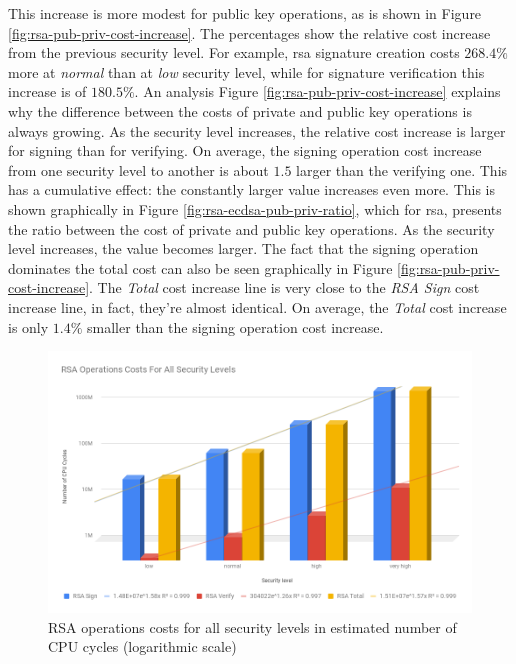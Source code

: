 This increase is more modest for public key operations, as is shown in Figure \ref{fig:rsa-pub-priv-cost-increase}.
The percentages show the relative cost increase from the previous security level. For example, \gls{rsa} signature creation costs
$268.4\%$ more at \textit{normal} than at \textit{low} security level, while for signature verification this increase is of $180.5\%$. 
An analysis Figure \ref{fig:rsa-pub-priv-cost-increase}
explains why the difference between the costs of private and public key operations is always growing. As the security level increases, the relative cost
increase is larger for signing than for verifying. On average, the signing operation cost increase from one security level to another
is about $1.5$ larger than the verifying one. This has a cumulative effect: the constantly larger value increases even more.
This is shown graphically in Figure \ref{fig:rsa-ecdsa-pub-priv-ratio}, which for \gls{rsa}, presents the ratio between the cost of private and
public key operations. As the security level increases, the value becomes larger. The fact that the signing operation dominates the total cost
can also be seen graphically in Figure \ref{fig:rsa-pub-priv-cost-increase}. The \textit{Total} cost increase line is very close to the
\textit{RSA Sign} cost increase line, in fact, they're almost identical. On average, the \textit{Total} cost increase is only $1.4\%$ smaller
than the signing operation cost increase.

\begin{figure}
  \centering
  \includegraphics[width=1.0\textwidth]{img/rsa_cost_all_sls.png}
  \centering \caption{\label{fig:rsa-costs-all-sls} RSA operations costs for all security levels in estimated number of CPU cycles (logarithmic scale)}
\end{figure}

